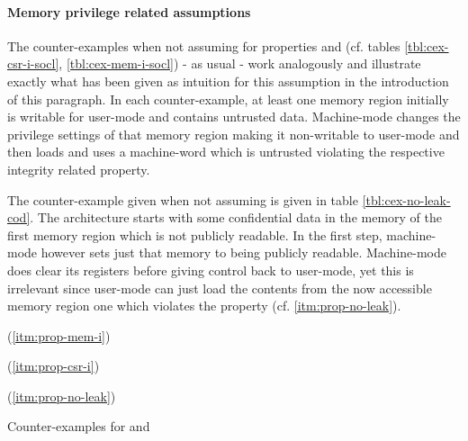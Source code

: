 \paragraph{Memory privilege related assumptions}
The counter-examples when not assuming  for properties  and  (cf. tables \ref{tbl:cex-csr-i-socl}, \ref{tbl:cex-mem-i-socl}) - as usual - work analogously and illustrate exactly what has been given as intuition for this assumption in the introduction of this paragraph.
In each counter-example, at least one memory region initially is writable for user-mode and contains untrusted data.
Machine-mode changes the privilege settings of that memory region making it non-writable to user-mode and then loads and uses a machine-word which is untrusted violating the respective integrity related property.

The counter-example given when not assuming  is given in table \ref{tbl:cex-no-leak-cod}.
The architecture starts with some confidential data in the memory of the first memory region which is not publicly readable.
In the first step, machine-mode however sets just that memory to being publicly readable.
Machine-mode does clear its registers before giving control back to user-mode, yet this is irrelevant since user-mode can just load the contents from the now accessible memory region one which violates the  property (cf. \ref{itm:prop-no-leak}).

\begin{table}
    \begin{subtable}{\textwidth}
        \centering
        
        \caption{ (\ref{itm:prop-mem-i})}
        \label{tbl:cex-mem-i-socl}
    \end{subtable}

    \begin{subtable}{\textwidth}
        \centering
        
        \caption{ (\ref{itm:prop-csr-i})}
        \label{tbl:cex-csr-i-socl}
    \end{subtable}

    \begin{subtable}{\textwidth}
        \centering
        
        \caption{ (\ref{itm:prop-no-leak})}
        \label{tbl:cex-no-leak-cod}
    \end{subtable}
    \caption{Counter-examples for  and }
\end{table}

